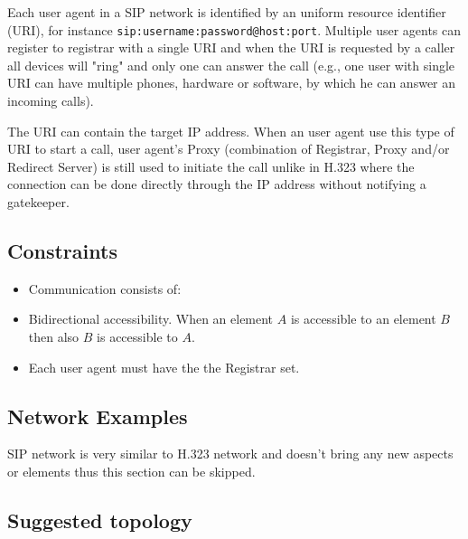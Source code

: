 Each user agent in a SIP network is identified by an uniform resource 
identifier (URI), for instance \verb|sip:username:password@host:port|. 
Multiple user agents can register to registrar with a single URI and when the 
URI is requested by a caller all devices will "ring" and only one can answer 
the call (e.g., one user with single URI can have multiple phones, hardware or 
software, by which he can answer an incoming calls).

The URI can contain the target IP address. When an user agent use this type of 
URI to start a call, user agent's Proxy (combination of Registrar, Proxy 
and/or Redirect Server) is still used to initiate the call unlike in H.323 
where the connection can be done directly through the IP address without 
notifying a gatekeeper.

\subsection{Constraints}

\begin{itemize}

\item Communication consists of:

\item Bidirectional accessibility. When an element $A$ is accessible to an 
element $B$ then also $B$ is accessible to $A$.

\item Each user agent must have the the Registrar set.

\end{itemize}

\subsection{Network Examples}

SIP network is very similar to H.323 network and doesn't bring any new aspects 
or elements thus this section can be skipped.

\subsection{Suggested topology}

